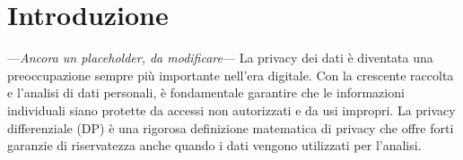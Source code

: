 \chapter*{Introduzione}
---\textit{Ancora un placeholder, da modificare}---
La privacy dei dati è diventata una preoccupazione sempre più importante nell'era digitale. Con la crescente raccolta e l'analisi di dati personali, è fondamentale garantire che le informazioni individuali siano protette da accessi non autorizzati e da usi impropri. La privacy differenziale (DP) è una rigorosa definizione matematica di privacy che offre forti garanzie di riservatezza anche quando i dati vengono utilizzati per l'analisi.

